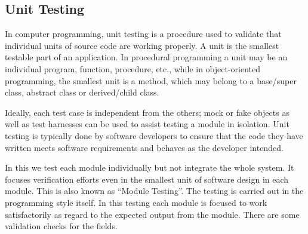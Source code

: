\documentclass[a4paper,12pt]{article}
\begin{document}
\subsection{Unit Testing}\vspace{2mm}
In computer programming, unit testing is a procedure used to validate that individual units of source code are working properly. A unit is the smallest testable part of an application. In procedural programming a unit may be an individual program, function, procedure, etc., while in object-oriented programming, the smallest unit is a method, which may belong to a base/super class, abstract class or derived/child class.
\par\vspace{2mm}
Ideally, each test case is independent from the others; mock or fake objects as well as test harnesses can be used to assist testing a module in isolation. Unit testing is typically done by software developers to ensure that the code they have written meets software requirements and behaves as the developer intended.\par\vspace{2mm}
In this we test each module individually but not integrate the whole system. It focuses verification efforts even in the smallest unit of software design in each module. This is also known as “Module Testing”.
The testing is carried out in the programming style itself. In this testing each module is focused to work satisfactorily as regard to the expected output from the module. There are some validation checks for the fields.
\end{document}
